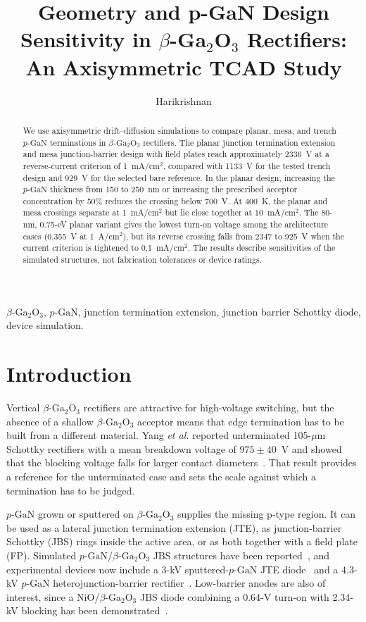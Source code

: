 \documentclass[journal,10pt]{IEEEtran}
\title{Geometry and p-GaN Design Sensitivity in \texorpdfstring{$\beta$-Ga$_2$O$_3$}{beta-Ga2O3} Rectifiers: An Axisymmetric TCAD Study}
\author{Harikrishnan}
\newcommand{\GaO}{\ensuremath{\beta\text{-}\mathrm{Ga}_2\mathrm{O}_3}}
\newcommand{\pGaN}{\ensuremath{p\text{-}\mathrm{GaN}}}
\begin{document}
\maketitle

\begin{abstract}
We use axisymmetric drift--diffusion simulations to compare planar, mesa, and trench \pGaN{} terminations in \GaO{} rectifiers. The planar junction termination extension and mesa junction-barrier design with field plates reach approximately 2336~V at a reverse-current criterion of 1~mA/cm$^2$, compared with 1133~V for the tested trench design and 929~V for the selected bare reference. In the planar design, increasing the \pGaN{} thickness from 150 to 250~nm or increasing the prescribed acceptor concentration by 50\% reduces the crossing below 700~V. At 400~K, the planar and mesa crossings separate at 1~mA/cm$^2$ but lie close together at 10~mA/cm$^2$. The 80-nm, 0.75-eV planar variant gives the lowest turn-on voltage among the architecture cases (0.355~V at 1~A/cm$^2$), but its reverse crossing falls from 2347 to 925~V when the current criterion is tightened to 0.1~mA/cm$^2$. The results describe sensitivities of the simulated structures, not fabrication tolerances or device ratings.
\end{abstract}

\begin{IEEEkeywords}
\GaO, \pGaN, junction termination extension, junction barrier Schottky diode, device simulation.
\end{IEEEkeywords}

\section{Introduction}
Vertical \GaO{} rectifiers are attractive for high-voltage switching, but the absence of a shallow \GaO{} acceptor means that edge termination has to be built from a different material. Yang \emph{et al.} reported unterminated 105-$\mu$m Schottky rectifiers with a mean breakdown voltage of $975\pm40$~V and showed that the blocking voltage falls for larger contact diameters~\cite{Yang2017}. That result provides a reference for the unterminated case and sets the scale against which a termination has to be judged.

\pGaN{} grown or sputtered on \GaO{} supplies the missing p-type region. It can be used as a lateral junction termination extension (JTE), as junction-barrier Schottky (JBS) rings inside the active area, or as both together with a field plate (FP). Simulated \pGaN/\GaO{} JBS structures have been reported~\cite{Nandi2021_TED,Than2024_PhysScr}, and experimental devices now include a 3-kV sputtered-\pGaN{} JTE diode~\cite{Chang2025_APL} and a 4.3-kV \pGaN{} heterojunction-barrier rectifier~\cite{Chang2026_TED}. Low-barrier anodes are also of interest, since a NiO/\GaO{} JBS diode combining a 0.64-V turn-on with 2.34-kV blocking has been demonstrated~\cite{Su2024_APL}.
\end{document}
